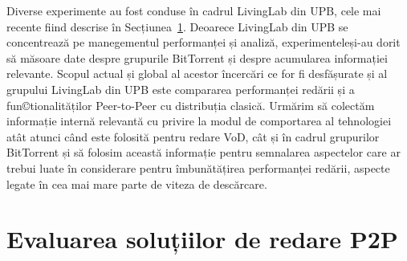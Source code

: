 Diverse experimente au fost conduse în cadrul LivingLab din UPB, cele mai
recente fiind descrise în Secțiunea~\ref{sec:multimedia-dist:evaluation}.
Deoarece LivingLab din UPB se concentrează pe manegementul performanței și
analiză, experimenteleși-au dorit să măsoare date despre grupurile
BitTorrent și despre acumularea informației relevante.
Scopul actual și global al acestor încercări ce for fi desfășurate și al
grupului LivingLab din UPB este compararea performanței redării și a
fun©tionalităților Peer-to-Peer cu distribuția clasică. Urmărim să colectăm
informație internă relevantă cu privire la modul de comportarea al tehnologiei
atât atunci când este folosită pentru redare VoD, cât și în cadrul grupurilor
BitTorrent și să folosim această informație pentru semnalarea aspectelor
care ar trebui luate în considerare pentru îmbunătățirea performanței redării,
aspecte legate în cea mai mare parte de viteza de descărcare.


\section{Evaluarea soluțiilor de redare P2P}
\label{sec:multimedia-dist:evaluation}

